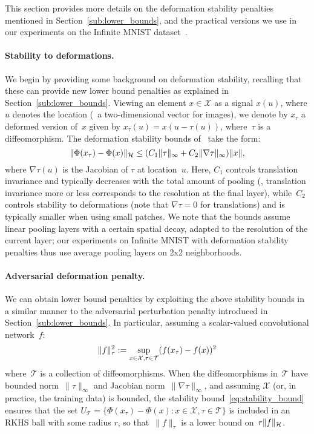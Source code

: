 
This section provides more details on the deformation stability penalties mentioned in
Section~\ref{sub:lower_bounds}, and the practical versions we use in our experiments on the
Infinite MNIST dataset~\citep{loosli-canu-bottou-2006}.

\paragraph{Stability to deformations.}
We begin by providing some background on deformation stability,
recalling that these can provide new lower bound penalties as explained in Section~\ref{sub:lower_bounds}.
Viewing an element $x \in \mathcal X$ as a signal $x(u)$, where $u$ denotes the location
(\eg~a two-dimensional vector for images),
we denote by $x_\tau$ a deformed version of~$x$ given by $x_\tau(u) = x(u - \tau(u))$,
where~$\tau$ is a diffeomorphism.
The deformation stability bounds of~\citet{bietti2018group} take the form:
\begin{equation}
\label{eq:stability_bound}
\|\Phi(x_\tau) - \Phi(x)\|_{\mathcal H} \leq (C_1 \|\tau\|_\infty + C_2 \|\nabla \tau\|_\infty) \|x\|,
\end{equation}
where $\nabla \tau (u)$ is the Jacobian of $\tau$ at location~$u$.
Here, $C_1$ controls translation invariance and typically decreases with the total amount of pooling
(\ie, translation invariance more or less corresponds to the resolution at the final layer),
while~$C_2$ controls stability to deformations (note that $\nabla \tau = 0$ for translations)
and is typically smaller when using small patches.
We note that the bounds assume linear pooling layers with a certain spatial decay,
adapted to the resolution of the current layer;
our experiments on Infinite MNIST with deformation stability penalties
thus use average pooling layers on 2x2 neighborhoods.


\paragraph{Adversarial deformation penalty.}
We can obtain lower bound penalties by exploiting the above stability bounds in
a similar manner to the adversarial perturbation penalty introduced in Section~\ref{sub:lower_bounds}.
In particular, assuming a scalar-valued convolutional network~$f$:
\begin{equation}
\label{eq:adv_deformation}
\|f\|_\tau^2 := \sup_{x \in \mathcal X, \tau \in \mathcal T} (f(x_\tau) - f(x))^2 \\
\end{equation}
where~$\mathcal T$ is a collection of diffeomorphisms.
When the diffeomorphisms in~$\mathcal T$ have bounded norm~$\|\tau\|_\infty$ and
Jacobian norm~$\|\nabla \tau\|_\infty$,
and assuming $\mathcal X$ (or, in practice, the training data) is bounded,
the stability bound~\ref{eq:stability_bound} ensures that
the set $U_{\mathcal T} = \{\Phi(x_\tau) - \Phi(x) : x \in \mathcal X, \tau \in \mathcal T\}$ is included in an
RKHS ball with some radius $r$, so that~$\|f\|_\tau$ is a lower bound on~$r \|f\|_{\mathcal H}$.

